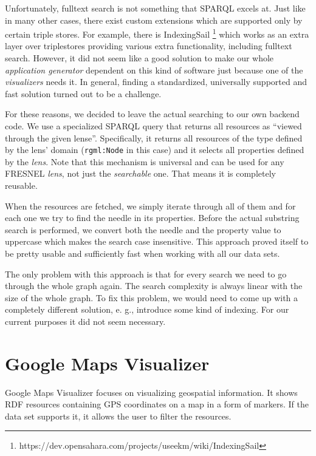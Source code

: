 Unfortunately, fulltext search is not something that SPARQL excels at. Just like in many other cases, there exist custom extensions which are supported only by certain triple stores. For example, there is IndexingSail \footnote{https://dev.opensahara.com/projects/useekm/wiki/IndexingSail} which works as an extra layer over triplestores providing various extra functionality, including fulltext search. However, it did not seem like a good solution to make our whole \emph{application generator} dependent on this kind of software just because one of the \emph{visualizers} needs it.  In general, finding a standardized, universally supported and fast solution turned out to be a challenge.

For these reasons, we decided to leave the actual searching to our own backend code. We use a specialized SPARQL query that returns all resources as “viewed through the given lense”. Specifically, it returns all resources of the type defined by the lens’ domain (\texttt{rgml:Node} in this case) and it selects all properties defined by the \emph{lens}. Note that this mechanism is universal and can be used for any FRESNEL \emph{lens}, not just the \emph{searchable} one. That means it is completely reusable.

When the resources are fetched, we simply iterate through all of them and for each one we try to find the needle in its properties. Before the actual substring search is performed, we convert both the needle and the property value to uppercase which makes the search case insensitive. This approach proved itself to be pretty usable and sufficiently fast when working with all our data sets.

The only problem with this approach is that for every search we need to go through the whole graph again. The search complexity is always linear with the size of the whole graph. To fix this problem, we would need to come up with a completely different solution, e. g., introduce some kind of indexing. For our current purposes it did not seem necessary.

\section{Google Maps Visualizer}
\label{sec:visualizers:google-maps}

Google Maps Visualizer focuses on visualizing geospatial information. It shows RDF resources containing GPS coordinates on a map in a form of markers. If the data set supports it, it allows the user to filter the resources.

